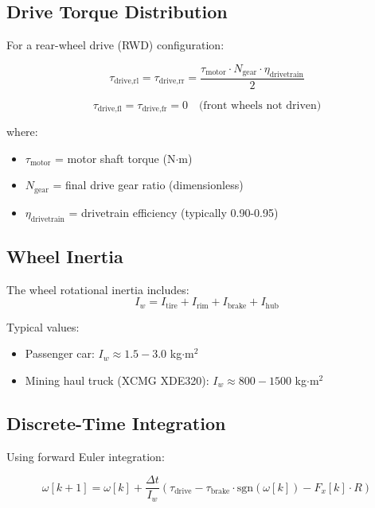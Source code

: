 \documentclass[11pt,a4paper]{article}
\begin{document}
\subsection{Drive Torque Distribution}

For a rear-wheel drive (RWD) configuration:

\begin{equation}
\tau_{\text{drive,rl}} = \tau_{\text{drive,rr}} = \frac{\tau_{\text{motor}} \cdot N_{\text{gear}} \cdot \eta_{\text{drivetrain}}}{2}
\end{equation}

\begin{equation}
\tau_{\text{drive,fl}} = \tau_{\text{drive,fr}} = 0 \quad \text{(front wheels not driven)}
\end{equation}

where:
\begin{itemize}
    \item $\tau_{\text{motor}}$ = motor shaft torque (N$\cdot$m)
    \item $N_{\text{gear}}$ = final drive gear ratio (dimensionless)
    \item $\eta_{\text{drivetrain}}$ = drivetrain efficiency (typically 0.90-0.95)
\end{itemize}

\subsection{Wheel Inertia}

The wheel rotational inertia includes:
\begin{equation}
I_w = I_{\text{tire}} + I_{\text{rim}} + I_{\text{brake}} + I_{\text{hub}}
\end{equation}

Typical values:
\begin{itemize}
    \item Passenger car: $I_w \approx 1.5-3.0$ kg$\cdot$m$^2$
    \item Mining haul truck (XCMG XDE320): $I_w \approx 800-1500$ kg$\cdot$m$^2$
\end{itemize}

\subsection{Discrete-Time Integration}

Using forward Euler integration:

\begin{equation}
\omega[k+1] = \omega[k] + \frac{\Delta t}{I_w} \left( \tau_{\text{drive}} - \tau_{\text{brake}} \cdot \text{sgn}(\omega[k]) - F_x[k] \cdot R \right)
\label{eq:wheel_integration}
\end{equation}
\end{document}
